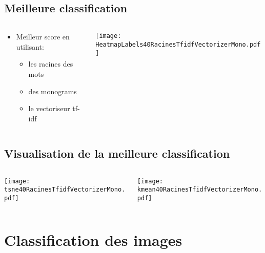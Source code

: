 \documentclass[8pt,aspectratio=169,hyperref={unicode=true}]{beamer}
\begin{document}
\subsection{Meilleure classification}
\begin{frame}{\insertsubsection}
    \begin{columns}
        \begin{column}{.4\textwidth}
            \begin{itemize}
                \item Meilleur score en utilisant:
                      \begin{itemize}
                          \item les racines des mots
                          \item des monograms
                          \item le vectoriseur tf-idf
                      \end{itemize}
            \end{itemize}
        \end{column}
        \begin{column}{.6\textwidth}
            \texttt{[image: HeatmapLabels40RacinesTfidfVectorizerMono.pdf]}
        \end{column}
    \end{columns}
\end{frame}

\subsection{Visualisation de la meilleure classification}
\begin{frame}{\insertsubsection}
    \begin{columns}
        \begin{column}{.5\textwidth}
            \texttt{[image: tsne40RacinesTfidfVectorizerMono.pdf]}
        \end{column}
        \begin{column}{.5\textwidth}
            \texttt{[image: kmean40RacinesTfidfVectorizerMono.pdf]}
        \end{column}
    \end{columns}
\end{frame}

\section{Classification des images}
\end{document}
